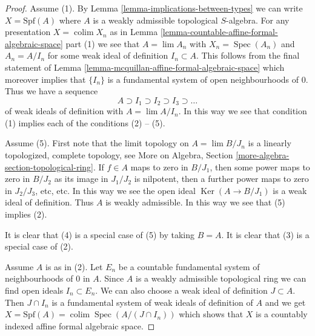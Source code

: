 \documentclass{stacks-project}
\theoremstyle{plain}
\theoremstyle{definition}
\theoremstyle{remark}
\numberwithin{equation}{subsection}
\def\lim{\mathop{\mathrm{lim}}\nolimits}
\def\colim{\mathop{\mathrm{colim}}\nolimits}
\def\Spec{\mathop{\mathrm{Spec}}}
\def\Ker{\mathop{\mathrm{Ker}}}
\begin{document}
\begin{proof}
Assume (1). By Lemma \ref{lemma-implications-between-types}
we can write $X = \text{Spf}(A)$ where $A$ is a weakly admissible
topological $S$-algebra. For any presentation $X = \colim X_n$ as in
Lemma \ref{lemma-countable-affine-formal-algebraic-space} part (1)
we see that $A = \lim A_n$ with $X_n = \Spec(A_n)$ and
$A_n = A/I_n$ for some weak ideal of definition $I_n \subset A$.
This follows from the final statement of
Lemma \ref{lemma-mcquillan-affine-formal-algebraic-space}
which moreover implies that $\{I_n\}$ is a fundamental system
of open neighbourhoods of $0$. Thus we have a sequence
$$
A \supset I_1 \supset I_2 \supset I_3 \supset \ldots
$$
of weak ideals of definition with $A = \lim A/I_n$. In this way
we see that condition (1) implies each of the conditions (2) -- (5).

\medskip\noindent
Assume (5). First note that the limit topology on
$A = \lim B/J_n$ is a linearly topologized, complete topology, see
More on Algebra, Section \ref{more-algebra-section-topological-ring}.
If $f \in A$ maps to zero in $B/J_1$, then some power maps to zero
in $B/J_2$ as its image in $J_1/J_2$ is nilpotent, then a further
power maps to zero in $J_2/J_3$, etc, etc. In this way we see
the open ideal $\Ker(A \to B/J_1)$ is a weak ideal of definition.
Thus $A$ is weakly admissible. In this way we see that (5) implies (2).

\medskip\noindent
It is clear that (4) is a special case of (5) by taking $B = A$.
It is clear that (3) is a special case of (2).

\medskip\noindent
Assume $A$ is as in (2). Let $E_n$ be a countable fundamental
system of neighbourhoods of $0$ in $A$. Since $A$ is a weakly
admissible topological ring we can find open ideals $I_n \subset E_n$.
We can also choose a weak ideal of definition $J \subset A$.
Then $J \cap I_n$ is a fundamental system of weak ideals of definition
of $A$ and we get
$X = \text{Spf}(A) = \colim \Spec(A/(J \cap I_n))$
which shows that $X$ is a countably indexed affine formal algebraic space.
\end{proof}
\end{document}
